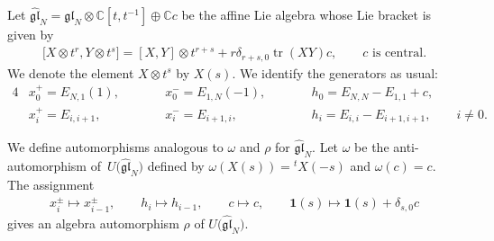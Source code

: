 \documentclass[10pt,a4paper]{amsart}
\theoremstyle{definition}
\numberwithin{equation}{section}
\DeclareMathOperator{\tr}{tr}
\newcommand{\bbC}{\mathbb{C}}
\newcommand{\gl}{\mathfrak{gl}}
\newcommand{\bfid}{\mathbf{1}}
\begin{document}
Let $\hat{\gl}_N = \gl_N \otimes \bbC[t,t^{-1}] \oplus \bbC c$ be the affine Lie algebra whose Lie bracket is given by
\begin{gather*}
\big[X \otimes t^{r}, Y \otimes t^{s}\big] = [X,Y] \otimes t^{r+s} + r \delta_{r+s,0} \tr(XY) c, \qquad \text{$c$ is central}.
\end{gather*}
We denote the element $X \otimes t^s$ by $X(s)$. We identify the generators as usual:
\begin{alignat*}{4}
& x_0^+= E_{N,1}(1), \qquad && x_0^{-} = E_{1,N}(-1), \qquad && h_0= E_{N,N} - E_{1,1} + c,&\\
& x_{i}^{+}= E_{i,i+1}, \qquad && x_i^{-}= E_{i+1,i}, \qquad &&h_i= E_{i,i}-E_{i+1,i+1}, \qquad i \neq 0.&
\end{alignat*}

We define automorphisms analogous to $\omega$ and $\rho$ for $\hat{\gl}_N$. Let $\omega$ be the anti-automorphism of~${U}\big(\hat{\gl}_N\big)$ defined by $\omega(X(s))= {}^{t}X(-s)$ and $\omega(c)=c$.
The assignment
\begin{gather*}
x_i^{\pm} \mapsto x_{i-1}^{\pm}, \qquad h_i \mapsto h_{i-1}, \qquad c \mapsto c, \qquad \bfid(s) \mapsto \bfid(s) + \delta_{s,0}c
\end{gather*}
gives an algebra automorphism $\rho$ of $U\big(\hat{\gl}_N\big)$.
\end{document}
